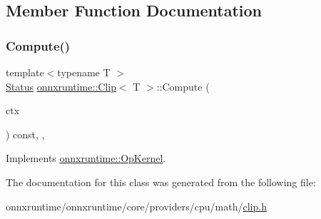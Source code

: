 \subsection{Member Function Documentation}
\mbox{\label{classonnxruntime_1_1Clip_aafda6211d18e1c90ca35430f1af80bbf}} 
\subsubsection{\texorpdfstring{Compute()}{Compute()}}
{\footnotesize\ttfamily template$<$typename T $>$ \\
\mbox{\hyperlink{classonnxruntime_1_1common_1_1Status}{Status}} \mbox{\hyperlink{classonnxruntime_1_1Clip}{onnxruntime\+::\+Clip}}$<$ T $>$\+::Compute (\begin{DoxyParamCaption}\item[{\mbox{\hyperlink{classonnxruntime_1_1OpKernelContext}{Op\+Kernel\+Context}} $\ast$}]{ctx }\end{DoxyParamCaption}) const\hspace{0.3cm}{\ttfamily [inline]}, {\ttfamily [override]}, {\ttfamily [virtual]}}



Implements \mbox{\hyperlink{classonnxruntime_1_1OpKernel_a9eca8656a78b1b3ab9d3351a12798650}{onnxruntime\+::\+Op\+Kernel}}.



The documentation for this class was generated from the following file\+:\begin{DoxyCompactItemize}
\item 
onnxruntime/onnxruntime/core/providers/cpu/math/\mbox{\hyperlink{clip_8h}{clip.\+h}}\end{DoxyCompactItemize}
